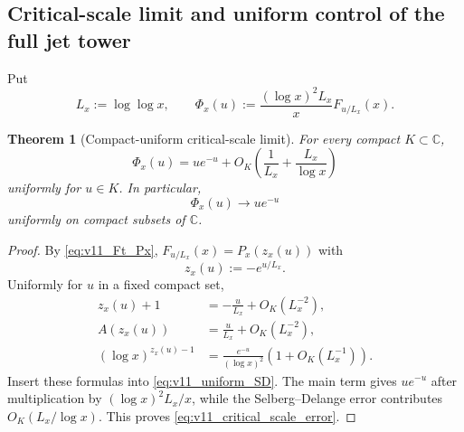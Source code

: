 \documentclass[11pt]{amsart}
\numberwithin{equation}{section}
\theoremstyle{plain}
\newtheorem{theorem}{Theorem}[section]
\theoremstyle{definition}
\theoremstyle{remark}
\begin{document}
\subsection{Critical-scale limit and uniform control of the full jet tower}
\label{subsec:v11_critical_scale}

Put
\begin{equation}
L_x:=\log\log x,
\qquad
\Phi_x(u):=
\frac{(\log x)^2L_x}{x}
F_{u/L_x}(x).
\label{eq:v11_Phi_definition}
\end{equation}

\begin{theorem}[Compact-uniform critical-scale limit]
\label{thm:v11_critical_scale_limit}
For every compact \(K\subset\mathbb C\),
\begin{equation}
\boxed{
\Phi_x(u)
=ue^{-u}
+O_K\!\left(
\frac1{L_x}+\frac{L_x}{\log x}
\right)}
\label{eq:v11_critical_scale_error}
\end{equation}
uniformly for \(u\in K\).  In particular,
\begin{equation}
\boxed{
\Phi_x(u)\longrightarrow ue^{-u}}
\label{eq:v11_critical_scale_limit}
\end{equation}
uniformly on compact subsets of \(\mathbb C\).
\end{theorem}

\begin{proof}
By \eqref{eq:v11_Ft_Px},
\(F_{u/L_x}(x)=P_x(z_x(u))\) with
\begin{equation}
z_x(u):=-e^{u/L_x}.
\label{eq:v11_zxu}
\end{equation}
Uniformly for \(u\) in a fixed compact set,
\begin{align}
z_x(u)+1
&=-\frac{u}{L_x}+O_K(L_x^{-2}),
\label{eq:v11_zxu_expansion}\\
A(z_x(u))
&=\frac{u}{L_x}+O_K(L_x^{-2}),
\label{eq:v11_A_zxu}\\
(\log x)^{z_x(u)-1}
&=\frac{e^{-u}}{(\log x)^2}
\left(1+O_K(L_x^{-1})\right).
\label{eq:v11_log_power_scale}
\end{align}
Insert these formulas into \eqref{eq:v11_uniform_SD}.  The main term gives
\(ue^{-u}\) after multiplication by \((\log x)^2L_x/x\), while the
Selberg--Delange error contributes \(O_K(L_x/\log x)\).  This proves
\eqref{eq:v11_critical_scale_error}.
\end{proof}
\end{document}
